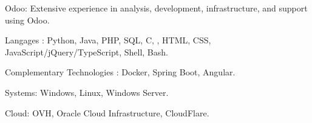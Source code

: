 \begin{indentsection}{\parindent}
  \begin{description*}
    \item[Odoo:] Extensive experience in analysis, development, infrastructure, and support using Odoo.

    \item[Langages :] Python, Java, PHP, SQL, C, \Csharp, HTML, CSS, JavaScript/jQuery/TypeScript, Shell, Bash.
    \item[Complementary Technologies :] Docker, Spring Boot, Angular.
    \item[Systems:] Windows, Linux, Windows Server.
    \item[Cloud:] OVH, Oracle Cloud Infrastructure, CloudFlare.

  \end{description*}
\end{indentsection}
